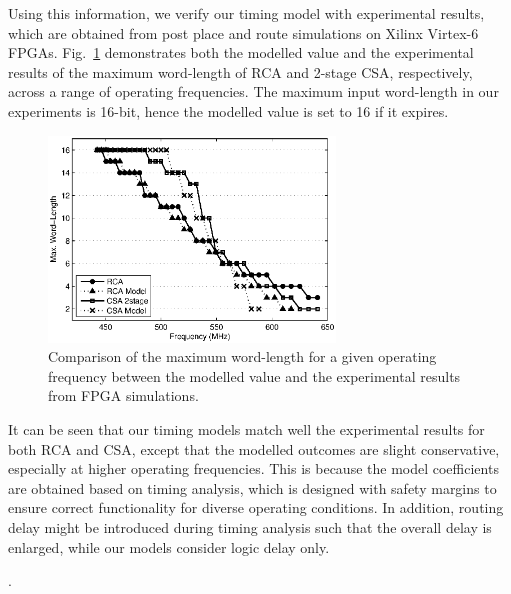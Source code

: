 \documentclass[journal]{IEEEtran}
\begin{document}
Using this information, we verify our timing model with experimental results, which are obtained from post place and route simulations on Xilinx Virtex-6 FPGAs. Fig.~\ref{CSA Model Verification} demonstrates both the modelled value and the experimental results of the maximum word-length of RCA and 2-stage CSA, respectively, across a range of operating frequencies. The maximum input word-length in our experiments is 16-bit, hence the modelled value is set to 16 if it expires. 
\begin{figure}[htbp]
  \centering
  \includegraphics[width=3in]{./Figures/Model.eps}
  \caption{Comparison of the maximum word-length for a given operating frequency between the modelled value and the experimental results from FPGA simulations.}
  \label{CSA Model Verification}
\end{figure}

It can be seen that our timing models match well the experimental results for both RCA and CSA, except that the modelled outcomes are slight conservative, especially at higher operating frequencies. This is because the model coefficients are obtained based on timing analysis, which is designed with safety margins to ensure correct functionality for diverse operating conditions. In addition, routing delay might be introduced during timing analysis such that the overall delay is enlarged, while our models consider logic delay only.

. 
\end{document}
